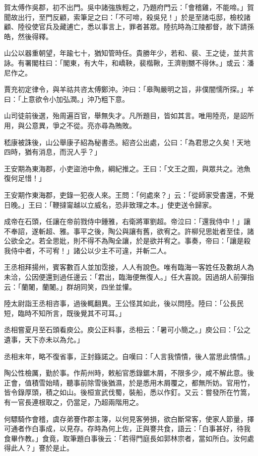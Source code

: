 賀太傅作吳郡，初不出門。吳中諸強族輕之，乃題府門云：「會稽雞，不能啼。」賀聞故出行，至門反顧，索筆足之曰：「不可啼，殺吳兒！」於是至諸屯邸，檢校諸顧、陸役使官兵及藏逋亡，悉以事言上，罪者甚眾。陸抗時為江陵都督，故下請孫皓，然後得釋。

山公以器重朝望，年踰七十，猶知管時任。貴勝年少，若和、裴、王之徒，並共言詠。有署閣柱曰：「閣東，有大牛，和嶠鞅，裴楷鞦，王濟剔嬲不得休。」或云：潘尼作之。

賈充初定律令，與羊祜共咨太傅鄭沖。沖曰：「皋陶嚴明之旨，非僕闇懦所探。」羊曰：「上意欲令小加弘潤。」沖乃粗下意。

山司徒前後選，殆周遍百官，舉無失才。凡所題目，皆如其言。唯用陸亮，是詔所用，與公意異，爭之不從。亮亦尋為賄敗。

嵇康被誅後，山公舉康子紹為秘書丞。紹咨公出處，公曰：「為君思之久矣！天地四時，猶有消息，而況人乎？」

王安期為東海郡，小吏盜池中魚，綱紀推之。王曰：「文王之囿，與眾共之。池魚復何足惜！」

王安期作東海郡，吏錄一犯夜人來。王問：「何處來？」云：「從師家受書還，不覺日晚。」王曰：「鞭撻甯越以立威名，恐非致理之本。」使吏送令歸家。

成帝在石頭，任讓在帝前戮侍中鍾雅，右衛將軍劉超。帝泣曰：「還我侍中！」讓不奉詔，遂斬超、雅。事平之後，陶公與讓有舊，欲宥之。許柳兒思妣者至佳，諸公欲全之。若全思妣，則不得不為陶全讓，於是欲并宥之。事奏，帝曰：「讓是殺我侍中者，不可宥！」諸公以少主不可違，并斬二人。

王丞相拜揚州，賓客數百人並加霑接，人人有說色。唯有臨海一客姓任及數胡人為未洽，公因便還到過任邊云：「君出，臨海便無復人。」任大喜說。因過胡人前彈指云：「蘭闍，蘭闍。」群胡同笑，四坐並懽。

陸太尉詣王丞相咨事，過後輒翻異。王公怪其如此，後以問陸。陸曰：「公長民短，臨時不知所言，既後覺其不可耳。」

丞相嘗夏月至石頭看庾公。庾公正料事，丞相云：「暑可小簡之。」庾公曰：「公之遺事，天下亦未以為允。」

丞相末年，略不復省事，正封籙諾之。自嘆曰：「人言我憒憒，後人當思此憒憒。」

陶公性檢厲，勤於事。作荊州時，敕船官悉錄鋸木屑，不限多少，咸不解此意。後正會，值積雪始晴，聽事前除雪後猶濕，於是悉用木屑覆之，都無所妨。官用竹，皆令錄厚頭，積之如山。後桓宣武伐蜀，裝船，悉以作釘。又云：嘗發所在竹篙，有一官長連根取之，仍當足，乃超兩階用之。

何驃騎作會稽，虞存弟謇作郡主簿，以何見客勞損，欲白斷常客，使家人節量，擇可通者作白事成，以見存。存時為何上佐，正與謇共食，語云：「白事甚好，待我食畢作教。」食竟，取筆題白事後云：「若得門庭長如郭林宗者，當如所白。汝何處得此人？」謇於是止。

